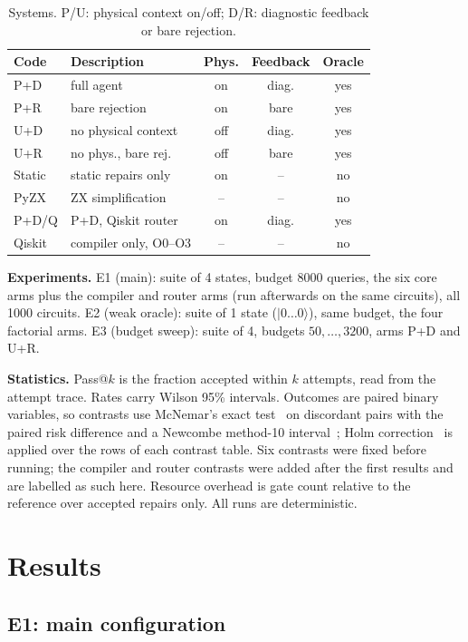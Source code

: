 \documentclass[journal]{IEEEtran}
\begin{document}
\begin{table}[t]
\centering
\caption{Systems. P/U: physical context on/off; D/R: diagnostic feedback or bare
rejection.}
\label{tab:arms}
\footnotesize
\begin{tabular}{llccc}
\toprule
Code & Description & Phys. & Feedback & Oracle \\
\midrule
P+D & full agent & on & diag. & yes \\
P+R & bare rejection & on & bare & yes \\
U+D & no physical context & off & diag. & yes \\
U+R & no phys., bare rej. & off & bare & yes \\
Static & static repairs only & on & -- & no \\
PyZX & ZX simplification & -- & -- & no \\
P+D/Q & P+D, Qiskit router & on & diag. & yes \\
Qiskit & compiler only, O0--O3 & -- & -- & no \\
\bottomrule
\end{tabular}
\end{table}

\textbf{Experiments.} E1 (main): suite of 4 states, budget 8000 queries, the six
core arms plus the compiler and router arms (run afterwards on the same
circuits), all 1000 circuits. E2 (weak oracle): suite of 1 state ($\lvert 0\ldots0
\rangle$), same budget, the four factorial arms. E3 (budget sweep): suite of 4,
budgets $50,\dots,3200$, arms P+D and U+R.

\textbf{Statistics.} Pass@$k$ is the fraction accepted within $k$ attempts, read
from the attempt trace. Rates carry Wilson 95\% intervals. Outcomes are paired
binary variables, so contrasts use McNemar's exact test~\cite{mcnemar1947} on
discordant pairs with the paired risk difference and a Newcombe method-10
interval~\cite{newcombe1998paired}; Holm correction~\cite{holm1979} is applied
over the rows of each contrast table. Six contrasts were fixed before
running; the compiler and router contrasts were added after the first results
and are labelled as such here. Resource overhead is gate count relative to the reference over accepted
repairs only. All runs are deterministic.

\section{Results}
\label{sec:results}

\subsection{E1: main configuration}
\end{document}
